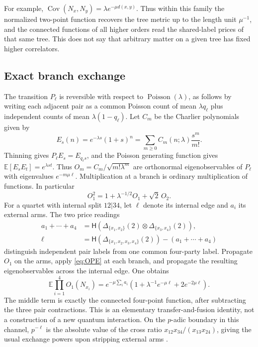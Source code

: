 \documentclass[11pt]{article}
\theoremstyle{remark}
\newcommand{\E}{\mathbb E}
\newcommand{\Cov}{\operatorname{Cov}}
\newcommand{\D}{\Delta}
\newcommand{\hprice}{\mathsf H}
\begin{document}
For example, \(\Cov(N_x,N_y)=\lambda e^{-\mu d(x,y)}\). Thus within this family the normalized two-point function recovers the tree metric up to the length unit \(\mu^{-1}\), and the connected functions of all higher orders read the shared-label prices of that same tree. This does not say that arbitrary matter on a given tree has fixed higher correlators.

\subsection{Exact branch exchange}

The transition \(P_\ell\) is reversible with respect to \(\operatorname{Poisson}(\lambda)\), as follows by writing each adjacent pair as a common Poisson count of mean \(\lambda q_\ell\) plus independent counts of mean \(\lambda(1-q_\ell)\). Let \(C_m\) be the Charlier polynomials given by
\[
 E_s(n)=e^{-\lambda s}(1+s)^n
      =\sum_{m\ge0}C_m(n;\lambda)\frac{s^m}{m!}.
\]
Thinning gives \(P_\ell E_s=E_{q_\ell s}\), and the Poisson generating function gives \(\E[E_sE_t]=e^{\lambda st}\). Thus \(O_m=C_m/\sqrt{m!\lambda^m}\) are orthonormal eigenobservables of \(P_\ell\) with eigenvalues \(e^{-m\mu\ell}\). Multiplication at a branch is ordinary multiplication of functions. In particular
\begin{equation}\label{eq:OPE}
 O_1^2=1+\lambda^{-1/2}O_1+\sqrt{2}\,O_2.
\end{equation}
For a quartet with internal split \(12|34\), let \(\ell\) denote its internal edge and \(a_i\) its external arms. The two price readings
\begin{align*}
 a_1+\cdots+a_4
   &=\hprice(\D_{\{x_1,x_2\}}(2)\otimes\D_{\{x_3,x_4\}}(2)),\\
 \ell&=\hprice(\D_{\{x_1,x_2,x_3,x_4\}}(2))-(a_1+\cdots+a_4)
\end{align*}
distinguish independent pair labels from one common four-party label. Propagate \(O_1\) on the arms, apply \eqref{eq:OPE} at each branch, and propagate the resulting eigenobservables across the internal edge. One obtains
\begin{equation}\label{eq:quartet}
 \E\prod_{i=1}^4 O_1(N_{x_i})
 =e^{-\mu\sum_i a_i}\left(1+\lambda^{-1}e^{-\mu\ell}
                                    +2e^{-2\mu\ell}\right).
\end{equation}
The middle term is exactly the connected four-point function, after subtracting the three pair contractions. This is an elementary transfer-and-fusion identity, not a construction of a new quantum interaction. On the \(p\)-adic boundary in this channel, \(p^{-\ell}\) is the absolute value of the cross ratio \(x_{12}x_{34}/(x_{13}x_{24})\), giving the usual exchange powers upon stripping external arms \cite{GP,HLM}.
\end{document}
